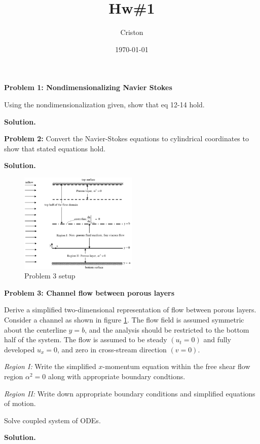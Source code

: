 \documentclass[11pt]{article}
\author{Criston}
\date{\today}
\title{Hw\#1}
\begin{document}
\maketitle

\textbf{Problem 1: Nondimensionalizing Navier Stokes}

Using the nondimensionalization given, show that eq 12-14 hold.

\textbf{Solution.}

\newpage

\textbf{Problem 2:} Convert the Navier-Stokes equations to cylindrical coordinates to show that stated equations hold.

\textbf{Solution.}

\newpage

\begin{figure}
  \centering
  \includegraphics[width=0.5\textwidth]{prob3.png}
  \caption{Problem 3 setup}
  \label{fig:prob3}
\end{figure}

\textbf{Problem 3: Channel flow between porous layers}

Derive a simplified two-dimensional representation of flow between porous layers. Consider a channel as shown in figure \ref{fig:prob3}. The flow field is assumed symmetric about the centerline $y=b$, and the analysis should be restricted to the bottom half of the system. The flow is assumed to be steady $(u_t = 0)$ and fully developed $u_x = 0$, and zero in cross-stream direction $(v=0)$.

\textit{Region I:} Write the simplified $x$-momentum equation within the free shear flow region $\alpha^2 = 0$ along with appropriate boundary condtions.

\textit{Region II:} Write down appropriate boundary conditions and simplified equations of motion.

Solve coupled system of ODEs.


\textbf{Solution.}
\end{document}
